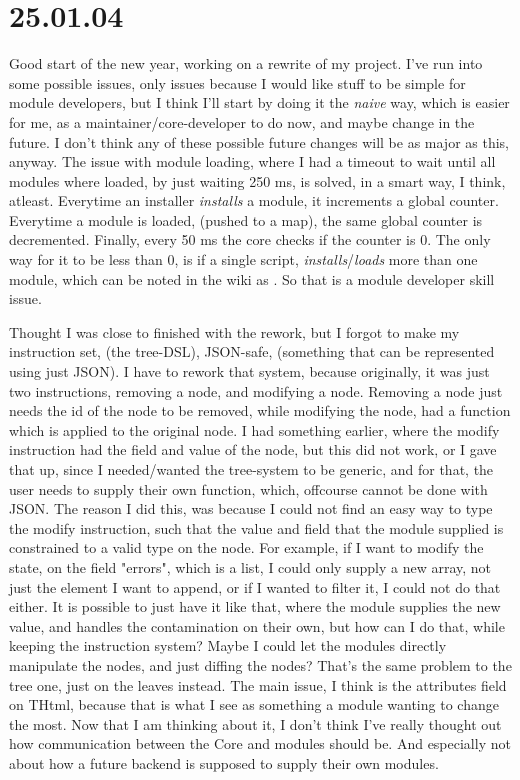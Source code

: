 \section{25.01.04}

Good start of the new year, working on a rewrite of my project. I've run into
some possible issues, only issues because I would like stuff to be simple for
module developers, but I think I'll start by doing it the \textit{naive} way,
which is easier for me, as a maintainer/core-developer to do now, and maybe
change in the future. I don't think any of these possible future changes will be
as major as this, anyway. The issue with module loading, where I had a timeout
to wait until all modules where loaded, by just waiting 250 ms, is solved, in a
smart way, I think, atleast. Everytime an installer \textit{installs} a module,
it increments a global counter. Everytime a module is loaded, (pushed to a map),
the same global counter is decremented. Finally, every 50 ms the core checks if
the counter is 0. The only way for it to be less than 0, is if a single script,
\textit{installs}/\textit{loads} more than one module, which can be noted in the
wiki as . So that is a module developer skill issue.

Thought I was close to finished with the rework, but I forgot to make my
instruction set, (the tree-DSL), JSON-safe, (something that can be represented
using just JSON). I have to rework that system, because originally, it was just
two instructions, removing a node, and modifying a node. Removing a node just
needs the id of the node to be removed, while modifying the node, had a function
which is applied to the original node. I had something earlier, where the modify
instruction had the field and value of the node, but this did not work, or I
gave that up, since I needed/wanted the tree-system to be generic, and for that,
the user needs to supply their own function, which, offcourse cannot be done
with JSON. The reason I did this, was because I could not find an easy way to
type the modify instruction, such that the value and field that the module
supplied is constrained to a valid type on the node. For example, if I want to
modify the state, on the field "errors", which is a list, I could only supply a
new array, not just the element I want to append, or if I wanted to filter it, I
could not do that either. It is possible to just have it like that, where the
module supplies the new value, and handles the contamination on their own, but
how can I do that, while keeping the instruction system? Maybe I could let the
modules directly manipulate the nodes, and just diffing the nodes? That's the
same problem to the tree one, just on the leaves instead. The main issue, I
think is the attributes field on THtml, because that is what I see as something
a module wanting to change the most.
Now that I am thinking about it, I don't think I've really thought out how
communication between the Core and modules should be. And especially not about
how a future backend is supposed to supply their own modules.

